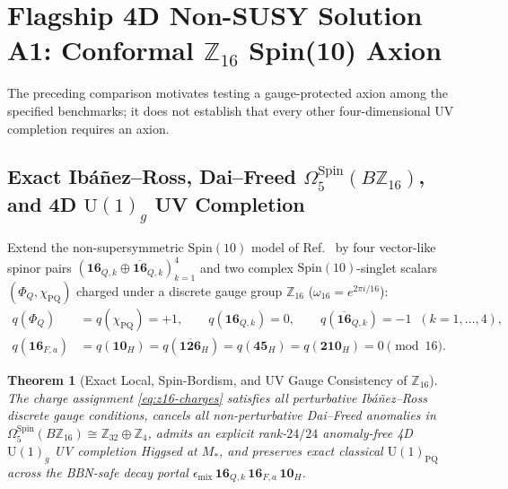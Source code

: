 \documentclass[11pt,a4paper]{article}
\newtheorem{theorem}{Theorem}[section]
\begin{document}
\section{Flagship 4D Non-SUSY Solution A1: Conformal \texorpdfstring{$\mathbb{Z}_{16}$}{Z16} Spin(10) Axion}
\label{sec:axion}

The preceding comparison motivates testing a gauge-protected axion among the specified benchmarks; it does not establish that every other four-dimensional UV completion requires an axion.

\subsection{Exact Ib\'a\~nez--Ross, Dai--Freed \texorpdfstring{$\Omega_5^{\mathrm{Spin}}(B\mathbb{Z}_{16})$}{Omega5Spin(BZ16)}, and 4D \texorpdfstring{$\mathrm{U}(1)_g$}{U(1)g} UV Completion}
\label{subsec:z16-anomalies}

Extend the non-supersymmetric $\mathrm{Spin}(10)$ model of Ref.~\cite{Olcsak2026Paper25} by four vector-like spinor pairs $(\mathbf{16}_{Q,k} \oplus \overline{\mathbf{16}}_{Q,k})_{k=1}^4$ and two complex $\mathrm{Spin}(10)$-singlet scalars $(\Phi_Q, \chi_{\mathrm{PQ}})$ charged under a discrete gauge group $\mathbb{Z}_{16}$ ($\omega_{16} = e^{2\pi i/16}$):
\begin{equation}
\begin{aligned}
q(\Phi_Q) &= q(\chi_{\mathrm{PQ}}) = +1, \qquad q(\mathbf{16}_{Q,k}) = 0, \qquad q(\overline{\mathbf{16}}_{Q,k}) = -1 \;\;(k=1,\dots,4), \\
q(\mathbf{16}_{F,a}) &= q(\mathbf{10}_H) = q(\overline{\mathbf{126}}_H) = q(\mathbf{45}_H) = q(\mathbf{210}_H) = 0 \pmod{16}.
\end{aligned}
\label{eq:z16-charges}
\end{equation}

\begin{theorem}[Exact Local, Spin-Bordism, and UV Gauge Consistency of $\mathbb{Z}_{16}$]
\label{thm:z16}
The charge assignment \eqref{eq:z16-charges} satisfies all perturbative Ib\'a\~nez--Ross discrete gauge conditions, cancels all non-perturbative Dai--Freed anomalies in $\Omega_5^{\mathrm{Spin}}(B\mathbb{Z}_{16}) \cong \mathbb{Z}_{32} \oplus \mathbb{Z}_4$, admits an explicit rank-$24/24$ anomaly-free 4D $\mathrm{U}(1)_g$ UV completion Higgsed at $M_*$, and preserves exact classical $\mathrm{U}(1)_{\mathrm{PQ}}$ across the BBN-safe decay portal $\epsilon_{\mathrm{mix}}\,\mathbf{16}_{Q,k}\,\mathbf{16}_{F,a}\,\mathbf{10}_H$.
\end{theorem}
\end{document}
